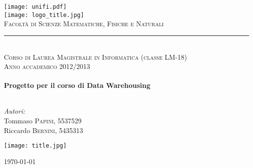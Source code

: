 \begin{titlepage}
	\begin{center}
		
		\texttt{[image: unifi.pdf]}\\[0.5cm]
		
		\texttt{[image: logo\_title.jpg]}\\
		\textsc{Facoltà di Scienze Matematiche, Fisiche e Naturali}\\
		\rule{0.8\linewidth}{0.2mm}\\
		\textsc{\footnotesize Corso di Laurea Magistrale in Informatica (classe LM-18)}\\[1.8cm]
		
		\textsc{Anno accademico 2012/2013}\\
		\HRule \\[0.4cm]
		{\huge \bfseries Progetto per il corso di Data Warehousing}\\[0.4cm]
		\HRule \\[0.6cm]
		
		\begin{flushleft}
			\begin{minipage}{0.4\textwidth}
				\emph{Autori:}\\
				Tommaso \textsc{Papini}, 5537529\\
				Riccardo \textsc{Bernini}, 5435313\\[0.5cm]
			\end{minipage}
		\end{flushleft}
		
		\texttt{[image: title.jpg]}
		
		\vfill
		
		{\large \monthyear\today}
		
	\end{center}
\end{titlepage}